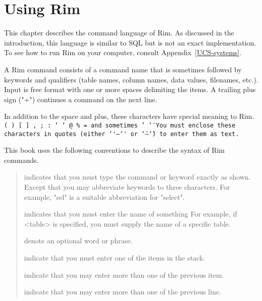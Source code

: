 \chapter{Using Rim}
\label{cmd-chapter}
This chapter describes the command language of Rim.
As discussed in the introduction, this language is similar to
SQL but is not an exact implementation.
To see how to run Rim on your computer, consult Appendix~\ref{UCS-systems}.
 
A Rim command consists of a command name that is sometimes followed by
keywords and qualifiers (table names, column names, data values,
filenames, etc.).
Input is free format with one or more spaces delimiting
the items.
A trailing plus sign ("+") continues a command on
the next line.
 
In addition to the space and plus, these characters have
special meaning to Rim.
\<\tt (~)~[~]~,~;~:~\char`\<~\char`\>~@~\%~= 
\rm and sometimes \tt ' \char`\"\>
You must enclose these characters in quotes 
(either {\tt\char`\'}---{\tt\char`\'} or
{\tt\char`\"}---{\tt\char`\"}) to enter them as text.

\medskip
 
This book uses the following conventions to
describe the syntax of Rim commands.
 
\medskip
\begin{quote}
    {\centering {}\par}
  \nopagebreak \medskip
  indicates that you must type the command or keyword
  exactly as shown.  Except that you may abbreviate keywords
  to three characters. For example,
  "sel" is a suitable abbreviation for "select".
 
  \bigskip
 
     {\centering {}\par}
  \nopagebreak \medskip
  indicates that you must enter the name of something
  For example, if <table> is specified,
  you must supply the name of a specific table.
 
  \bigskip
 
     {\centering  {}\par}
  \nopagebreak \medskip
  denote an optional word or phrase.
 
  \bigskip
 
     {\centering {}\par}
  \nopagebreak \medskip
  indicate that you must enter one
  of the items in the stack.
 
  \bigskip
 
{\centering \fbox{\strut\ \ldots\ }\par}
  \nopagebreak \medskip
  indicate that you may enter more than one of the previous item.
  \bigskip
 
     {\centering \fbox{\strut\ \vdots\ }\par}
  \nopagebreak \medskip
  indicate that you may enter more than one of the previous line.
 
\end{quote}
 

